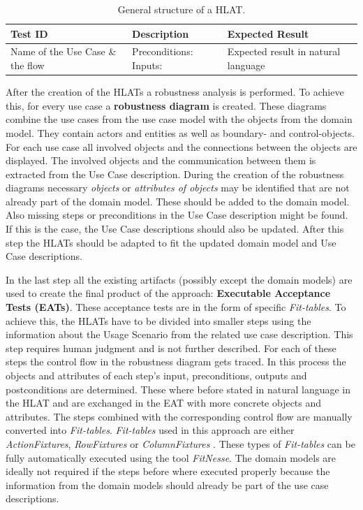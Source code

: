 \begin{table}[H]
	\begin{small}
	\caption{General structure of a HLAT.}
	\renewcommand{\arraystretch}{1.5}
	\begin{tabularx}{\textwidth}{X|X|X}
		\hline
  		\textbf{Test ID} & \textbf{Description} & \textbf{Expected \newline Result} \\
  		\hline
  		Name of the Use Case \& the flow & Preconditions: \newline Inputs: & Expected result in natural language \\
  		\hline
 	\end{tabularx}
 	\renewcommand{\arraystretch}{1}
 	\label{fig:1}
 	\end{small}	
\end{table}


After the creation of the HLATs a robustness analysis is performed.
To achieve this, for every use case a \textbf{robustness diagram} is created.
These diagrams combine the use cases from the use case model with the objects from the domain model.
They contain actors and entities as well as boundary- and control-objects.
For each use case all involved objects and the connections between the objects are displayed.
The involved objects and the communication between them is extracted from the Use Case description.
During the creation of the robustness diagrams necessary \textit{objects} or \textit{attributes of objects} may be identified that are not already part of the domain model.
These should be added to the domain model.
Also missing steps or preconditions in the Use Case description might be found.
If this is the case, the Use Case descriptions should also be updated.
After this step the HLATs should be adapted to fit the updated domain model and Use Case descriptions.

In the last step all the existing artifacts (possibly except the domain models) are used to create the final product of the approach: \textbf{Executable Acceptance Tests (EATs)}.
These acceptance tests are in the form of specific \textit{Fit-tables}.
To achieve this, the HLATs have to be divided into smaller steps using the information about the Usage Scenario from the related use case description.
This step requires human judgment and is not further described.
For each of these steps the control flow in the robustness diagram gets traced.
In this process the objects and attributes of each step's input, preconditions, outputs and postconditions are determined.
These where before stated in natural language in the HLAT and are exchanged in the EAT with more concrete objects and attributes.
The steps combined with the corresponding control flow are manually converted into \textit{Fit-tables}.
\textit{Fit-tables} used in this approach are either \textit{ActionFixtures}, \textit{RowFixtures} or \textit{ColumnFixtures} \cite{Fit-tables}.
These types of \textit{Fit-tables} can be fully automatically executed using the tool \textit{FitNesse}.
The domain models are ideally not required if the steps before where executed properly because the information from the domain models should already be part of the use case descriptions.

